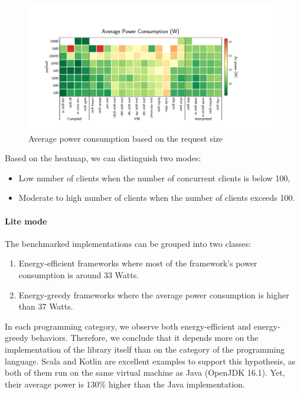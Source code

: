 \begin{figure}[!hbt]
    \begin{center}
        \includegraphics[width=1.2\linewidth]{imgs/power_consumption_payload}
    \end{center}
    \caption{Average power consumption based on the request size}\label{fig:power_consumption_payload}
\end{figure}

Based on the heatmap, we can distinguish two modes:
\begin{itemize}
    \item \textsf{Low number of clients} when the number of concurrent clients is below 100,
    \item \textsf{Moderate to high number of clients} when the number of clients exceeds 100.
\end{itemize}


\paragraph{Lite mode}
The benchmarked implementations can be grouped into two classes:
\begin{enumerate}
    \item \textsf{Energy-efficient frameworks} where most of the framework's power consumption is around 33 Watts.
    \item \textsf{Energy-greedy frameworks} where the average power consumption is higher than 37 Watts.
\end{enumerate}

In each programming category, we observe both energy-efficient and energy-greedy behaviors.
Therefore, we conclude that it depends more on the implementation of the library itself than on the category of the programming language.
Scala and Kotlin are excellent examples to support this hypothesis, as both of them run on the same virtual machine as Java (OpenJDK 16.1).
Yet, their average power is 130\% higher than the Java implementation.


